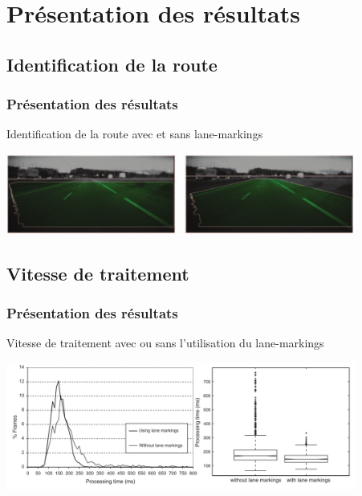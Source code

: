 \section{Présentation des résultats}

\subsection{Identification de la route}
\begin{frame}
\frametitle{Présentation des résultats}

Identification de la route avec et sans lane-markings
\begin{center}
  \includegraphics[width=11.5cm]{image/avec_sans_lane_markings_information.png}
\end{center}

\end{frame}

\subsection{Vitesse de traitement}
\begin{frame}
\frametitle{Présentation des résultats}

Vitesse de traitement avec ou sans l'utilisation du lane-markings
\begin{center}
  \includegraphics[width=11.5cm]{image/graphique_comparaison_vitesse_traitement_utilisation_lane_markings.png}
\end{center}

\end{frame}

